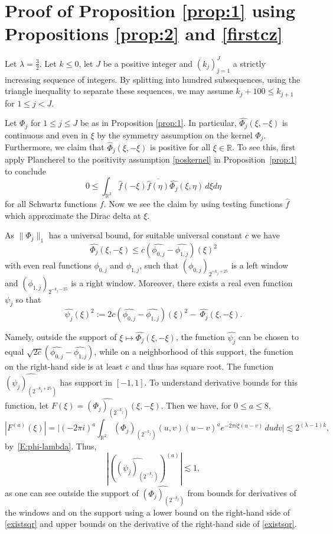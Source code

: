 \documentclass[12pt,reqno]{amsart}
\theoremstyle{plain}
\theoremstyle{definition}
\numberwithin{equation}{section}
\newcommand{\R}{{\mathbb R}}
\def\wh{\widehat}
\begin{document}
\section{Proof of Proposition \ref{prop:1}  using Propositions \ref{prop:2} and
\ref{firstcz}}
\label{sec:prop:1}
Let $\lambda=\frac{3}{2}$. 
Let $k \leq 0$, let $J$ be a positive integer and   $(k_j)_{j=1}^J$  a strictly  increasing sequence of integers.
By splitting into hundred subsequences, using the triangle inequality 
to separate these sequences, we may assume $k_j+100\le k_{j+1}$ for $1\le j<J$.

Let $\Phi_j$ for $1\le j\le J$ be as in Proposition \ref{prop:1}.
In particular, 
$\widehat{\Phi_j}(\xi,-\xi)$ is continuous and even in $\xi$ by the symmetry assumption on the kernel $\Phi_j$.
Furthermore, we claim that 
 $\widehat{\Phi}_j(\xi,-\xi)$ is positive for all $\xi\in \R$.
To see this, first apply Plancherel to the positivity assumption
\eqref{poskernel} in Proposition~\ref{prop:1} to conclude
 \[0\le \int_{\R^2} \widehat{f}(-\xi)\overline{\widehat{f}(\eta)}\widehat{\Phi_j}(\xi,\eta)\, d\xi d\eta\]
 for all Schwartz functions $f$.
 Now we see the claim by using  testing functions $\widehat{f}$ 
 which approximate the Dirac delta at $\xi$.



As $\|\Phi_j\|_1$ has a universal bound, 
for suitable universal constant $c$ we have
$$ \widehat{\Phi_j}(\xi,-\xi)\le c(\widehat{\phi_{0,j}}-\widehat{\phi_{1,j}})(\xi)^2$$
with even real functions $\phi_{0,j}$ and $\phi_{1,j}$,
such that ${(\phi_{0,j})_{2^{-k_j+25}}}$ is a left window and ${(\phi_{1,j})_{2^{-k_j-25}}}$
is a right window.
Moreover, there exists a real even function $\psi_j$ so that
\begin{equation}\label{existsqr}
\widehat{\psi_j}(\xi)^2:=2c (\widehat{\phi_{0,j}}-\widehat{\phi_{1,j}})(\xi)^2-\ \widehat{\Phi_j}(\xi,-\xi).
\end{equation}

Namely, outside the support of $\xi \mapsto \widehat{\Phi_j}(\xi,-\xi)$,
the function $\widehat{\psi_j}$ can be chosen to equal ${\sqrt{2c}}(\widehat{\phi_{0,j}}-\widehat{\phi_{1,j}})$,
while on a neighborhood of this support, the function on the right-hand side is at least $c$ and thus has square root.
The function $\widehat{(\psi_j)_{(2^{-k_j+25})}}$ has support in
$[-1,1]$. 
To understand derivative bounds for this function, let $F(\xi)=\wh{(\Phi_j)_{(2^{-k_j})}}(\xi,-\xi)$. Then we have, for $0\le a\le 8$,
\[
|F^{(a)}(\xi)|=
\Big |(-2\pi i)^a \int_{\R^2} (\Phi_j)_{(2^{-k_j})}(u,v) (u-v)^a e^{-2\pi i \xi  (u - v)} \,du dv \Big |\lesssim 2^{(\lambda-1) k},
\]
by~\eqref{E:phi-lambda}. Thus, 
\begin{equation}\label{psiderivatives}
|(\wh{(\psi_j)_{(2^{-k_j})}})^{(a)}| \lesssim 1,
\end{equation}
as one can see outside the support of $\wh{(\Phi_j)_{(2^{-k_j})}}$
from bounds for derivatives of the windows and on the support using a lower bound
on the right-hand side of \eqref{existsqr} and upper bounds on the derivative of the right-hand side of \eqref{existsqr}.
\end{document}
